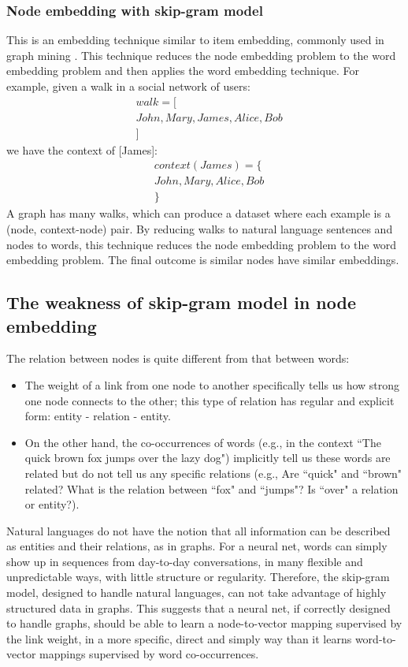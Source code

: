 \documentclass[11pt,twocolumn]{article}
\begin{document}
\subsubsection{Node embedding with skip-gram model}
This is an embedding technique similar to item embedding, commonly used in
graph mining \cite{perozzi2014deepwalk} \cite{grover2016node2vec}.
This technique reduces the node embedding problem to the word embedding problem and then applies the word embedding technique.
For example, given a walk in a social network of users:
\begin{align*}
	&walk = [\\
	&John, Mary, James, Alice, Bob\\
	&]
\end{align*}
we have the context of [James]:
\begin{align*}
	&context(James) = \{\\
	&John, Mary, Alice, Bob\\
	&\}
\end{align*}
A graph has many walks, which can produce a dataset where each example is a (node, context-node) pair.
By reducing walks to natural language sentences and nodes to words,
this technique reduces the node embedding problem to the word embedding problem.
The final outcome is similar nodes have similar embeddings.

\subsection{The weakness of skip-gram model in node embedding}
The relation between nodes is quite different from that between words:
\begin{itemize}
	\item The weight of a link from one node to another specifically tells us
	how strong one node connects to the other;
	this type of relation has regular and explicit form:
	entity - relation - entity.
	\item On the other hand, the co-occurrences of words 
	(e.g., in the context ``The quick brown fox jumps over the lazy dog")
	implicitly tell us these words are related
	but do not tell us any specific relations
	(e.g., Are ``quick" and ``brown" related? What is the relation between ``fox" and ``jumps"? Is ``over" a relation or entity?).
\end{itemize}
Natural languages do not have the notion that
all information can be described as entities and their relations, as in graphs.
For a neural net, 
words can simply show up in sequences from day-to-day conversations,
in many flexible and unpredictable ways, with little structure or regularity.
Therefore, the skip-gram model, designed to handle natural languages,
can not take advantage of highly structured data in graphs.
This suggests that a neural net, if correctly designed to handle graphs,
should be able to learn a node-to-vector mapping supervised by the link weight,
in a more specific, direct and simply way than it learns word-to-vector 
mappings supervised by word co-occurrences.
\end{document}
